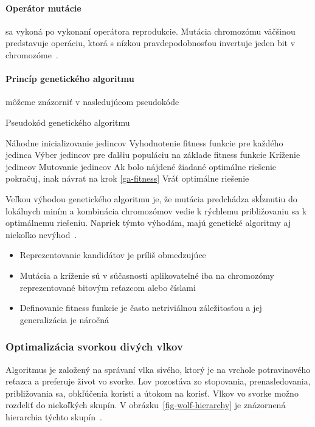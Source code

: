 \documentclass[a4paper,slovak,12pt,appendix]{article}
\begin{document}
\paragraph{Operátor mutácie} sa vykoná po vykonaní operátora reprodukcie.
Mutácia chromozómu väčšinou predstavuje operáciu, ktorá s nízkou
pravdepodobnosťou invertuje jeden bit v chromozóme~\cite{Chavan2015}.

\paragraph{Princíp genetického algoritmu} môžeme znázorniť v nasledujúcom
pseudokóde~\cite{Chavan2015}
\begin{algorithm}
  \caption{Pseudokód genetického algoritmu}
  \begin{algorithmic}[1]
    \State Náhodne inicializovanie jedincov
    \State Vyhodnotenie fitness funkcie pre každého jedinca \label{ga-fitness}
    \State Výber jedincov pre ďalšiu populáciu na základe fitness funkcie
    \State Kríženie jedincov
    \State Mutovanie jedincov
    \State Ak bolo nájdené žiadané optimálne riešenie pokračuj, inak návrat na krok \ref{ga-fitness}
    \State Vráť optimálne riešenie
  \end{algorithmic}
\end{algorithm}

Veľkou výhodou genetického algoritmu je, že mutácia predchádza skĺznutiu do
lokálnych miním a kombinácia chromozómov vedie k rýchlemu približovaniu
sa k optimálnemu riešeniu. Napriek týmto výhodám, majú genetické algoritmy aj
niekoľko nevýhod~\cite{Deolekar2016}.
\begin{itemize}
  \item Reprezentovanie kandidátov je príliš obmedzujúce
  \item Mutácia a kríženie sú v súčasnosti aplikovateľné iba na chromozómy
        reprezentované bitovým reťazcom alebo číslami
  \item Definovanie fitness funkcie je často netriviálnou záležitosťou
        a jej generalizácia je náročná
\end{itemize}


\subsubsection{Optimalizácia svorkou divých vlkov}
Algoritmus je založený na správaní vlka sivého, ktorý je na vrchole
potravinového reťazca a preferuje život vo svorke. Lov pozostáva zo stopovania,
prenasledovania, približovania sa, obkľúčenia koristi a útokom na korisť. Vlkov
vo svorke možno rozdeliť do niekoľkých skupín.
V obrázku~\ref{fig-wolf-hierarchy} je znázornená hierarchia týchto
skupín~\cite{Seeley1991}.
\end{document}

